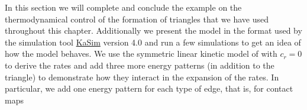 In this section we will complete and conclude the example
on the thermodynamical control of the formation of triangles
that we have used throughout this chapter.
Additionally we present the model in the format
used by the simulation tool
\href{https://github.com/Kappa-Dev/KaSim}{KaSim}
version 4.0
\citep{KaSimManual2014}
and run a few simulations to get an idea
of how the model behaves.
We use the symmetric linear kinetic model of 
with $c_r = 0$ to derive the rates
and add three more energy patterns
(in addition to the triangle)
to demonstrate how they interact in the expansion of the rates.
In particular, we add one energy pattern for each type of edge,
that is, for contact maps
\begin{center}
\end{center}

